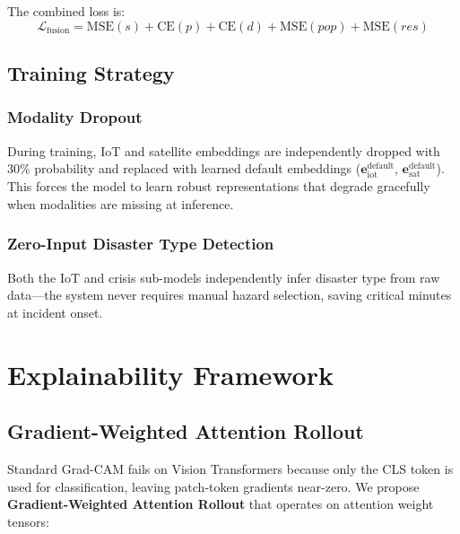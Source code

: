 \documentclass[journal]{IEEEtran}
\begin{document}
The combined loss is:
\begin{equation}
\mathcal{L}_\text{fusion} = \text{MSE}(s) + \text{CE}(p) + \text{CE}(d) + \text{MSE}(pop) + \text{MSE}(res)
\end{equation}

\subsection{Training Strategy}

\subsubsection{Modality Dropout}

During training, IoT and satellite embeddings are independently dropped with 30\% probability and replaced with learned default embeddings ($\mathbf{e}_\text{iot}^\text{default}$, $\mathbf{e}_\text{sat}^\text{default}$). This forces the model to learn robust representations that degrade gracefully when modalities are missing at inference.

\subsubsection{Zero-Input Disaster Type Detection}

Both the IoT and crisis sub-models independently infer disaster type from raw data---the system never requires manual hazard selection, saving critical minutes at incident onset.

\section{Explainability Framework}

\subsection{Gradient-Weighted Attention Rollout}

Standard Grad-CAM fails on Vision Transformers because only the CLS token is used for classification, leaving patch-token gradients near-zero. We propose \textbf{Gradient-Weighted Attention Rollout} that operates on attention weight tensors:
\end{document}
